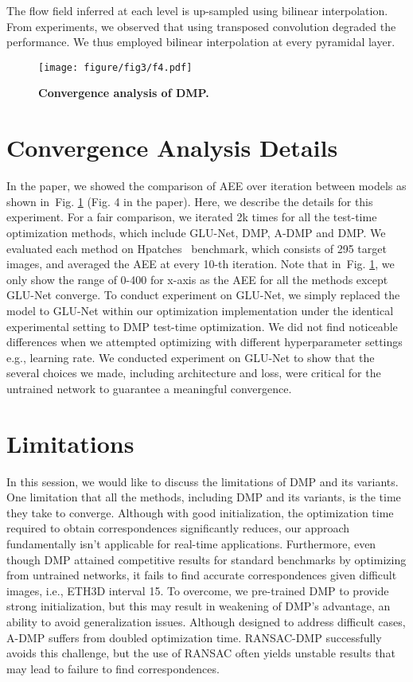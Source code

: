 \documentclass[10pt,twocolumn,letterpaper]{article}
\newcommand{\figref}[1]{Fig. \ref{#1}}
\begin{document}
The flow field inferred at each level is up-sampled using bilinear interpolation. From experiments, we observed that using transposed convolution degraded the performance. We thus employed bilinear interpolation at every pyramidal layer.  
\begin{figure}
	\centering
\texttt{[image: figure/fig3/f4.pdf]}
  \caption{\textbf{Convergence analysis of DMP.}}\vspace{-10pt}\label{fig2:supp}
\end{figure}

\section{Convergence Analysis Details}\label{sec:2}
In the paper, we showed the comparison of AEE over iteration between models as shown in~\figref{fig2:supp} (Fig. 4 in the paper). 
Here, we describe the details for this experiment. For a fair comparison, we iterated 2k times for all the test-time optimization methods, which include GLU-Net, DMP, A-DMP and DMP. We evaluated each method on Hpatches~\cite{balntas2017hpatches} benchmark, which consists of 295 target images, and averaged the AEE at every 10-th iteration. Note that in~\figref{fig2:supp}, we only show the range of 0-400 for x-axis as the AEE for all the methods except GLU-Net converge. To conduct experiment on GLU-Net, we simply replaced the model to GLU-Net within our optimization implementation under the identical experimental setting to DMP test-time optimization. We did not find noticeable differences when we attempted optimizing with different hyperparameter settings e.g., learning rate. We conducted experiment on GLU-Net to show that the several choices we made, including architecture and loss, were critical for the untrained network to guarantee a meaningful convergence.

\section{Limitations}\label{limit}
In this session, we would like to discuss the limitations of DMP and its variants. One limitation that all the methods, including DMP and its variants, is the time they take to converge. Although with good initialization, the optimization time required to obtain correspondences significantly reduces, our approach fundamentally isn't applicable for real-time applications. Furthermore, even though DMP attained competitive results for standard benchmarks by optimizing from untrained networks, it fails to find accurate correspondences given difficult images, i.e., ETH3D interval 15. To overcome, we pre-trained DMP to provide strong initialization, but this may result in weakening of DMP's advantage, an ability to avoid generalization issues. Although designed to address difficult cases, A-DMP suffers from doubled optimization time. RANSAC-DMP successfully avoids this challenge, but the use of RANSAC often yields unstable results that may lead to failure to find correspondences. 
\end{document}
